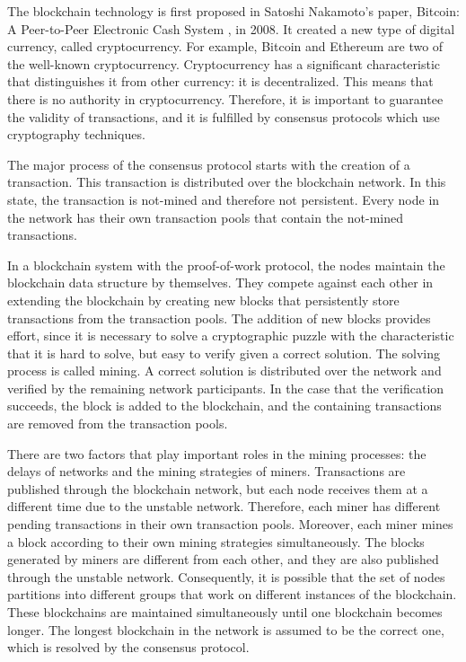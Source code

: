 The blockchain technology is first proposed in Satoshi Nakamoto’s paper, Bitcoin: A Peer-to-Peer Electronic Cash System \cite{Nakamoto2008}, in 2008. It created a new type of digital currency, called cryptocurrency. For example, Bitcoin \cite{bitcoin} and Ethereum \cite{ethereum} are two of the well-known cryptocurrency. Cryptocurrency has a significant characteristic that distinguishes it from other currency: it is decentralized. This means that there is no authority in cryptocurrency. Therefore, it is important to guarantee the validity of transactions, and it is fulfilled by consensus protocols which use cryptography techniques. \cite{Narayanan2016}

The major process of the consensus protocol starts with the creation of a transaction. This transaction is distributed over the blockchain network. In this state, the transaction is not-mined and therefore not persistent. Every node in the network has their own transaction pools that contain the not-mined transactions.

In a blockchain system with the proof-of-work protocol, the nodes maintain the blockchain data structure by themselves. They compete against each other in extending the blockchain by creating new blocks that persistently store transactions from the transaction pools. The addition of new blocks provides effort, since it is necessary to solve a cryptographic puzzle with the characteristic that it is hard to solve, but easy to verify given a correct solution. The solving process is called mining. A correct solution is distributed over the network and verified by the remaining network participants. In the case that the verification succeeds, the block is added to the blockchain, and the containing transactions are removed from the transaction pools.

There are two factors that play important roles in the mining processes: the delays of networks and the mining strategies of miners. Transactions are published through the blockchain network, but each node receives them at a different time due to the unstable network. Therefore, each miner has different pending transactions in their own transaction pools. Moreover, each miner mines a block according to their own mining strategies simultaneously. The blocks generated by miners are different from each other, and they are also published through the unstable network. Consequently, it is possible that the set of nodes partitions into different groups that work on different instances of the blockchain. These blockchains are maintained simultaneously until one blockchain becomes longer. The longest blockchain in the network is assumed to be the correct one, which is resolved by the consensus protocol.

